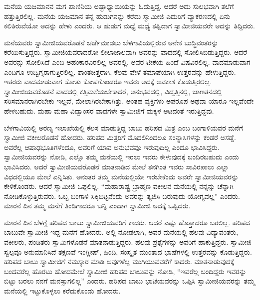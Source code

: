  ಮನೆಯ ಯಜಮಾನನ ಮಗ ಪಾಣಿನಿಯ ಅಷ್ಟಾಧ್ಯಾಯಿಯನ್ನು ಓದುತ್ತಿದ್ದ. ಆದರೆ ಅದು ಸುಲಭವಾಗಿ ತಲೆಗೆ ಹತ್ತುತ್ತಿರಲಿಲ್ಲ. ಮನೆಯ ಯಜಮಾನ ತನ್ನ ಹುಡುಗನನ್ನು ಕರೆದು ಸ್ವಾಮೀಜಿ ಎದುರಿಗೆ ವ್ಯಾಕರಣದಲ್ಲಿ ಏನು ಕಲಿತಿರುವೆಯೋ ಅದನ್ನು ಹೇಳು ಎಂದರು. ಆ ಹುಡುಗ ಮಧ್ಯೆ ಮಧ್ಯೆ ತಪ್ಪಿದಾಗ ಸ್ವಾಮೀಜಿಯವರೇ ಅದನ್ನು ತಿದ್ದಿದರು. 

 ಮನೆಯವರು ಸ್ವಾಮೀಜಿಯವರೊಡನೆ ಚರ್ಚೆಮಾಡಲು ಬೆಳಗಾವಿಯಲ್ಲಿರುವ ಅನೇಕ ಬುದ್ಧಿವಂತರನ್ನು ಕರೆಯಿಸುತ್ತಿದ್ದರು. ಸ್ವಾಮೀಜಿಯವರಾದರೋ ಲೀಲಾಜಾಲವಾಗಿ ಅವರನ್ನು ವಾದದಲ್ಲಿ ಸೋಲಿಸಿಬಿಡುತ್ತಿದ್ದರು. ಆದರೆ ಅವರನ್ನು ಸೋಲಿಸಿದೆ ಎಂಬ ಅಹಂಕಾರವಿರಲಿಲ್ಲ ಅವರಲ್ಲಿ. ಅವರ ಟೀಕೆಯ ಹಿಂದೆ ವಿಷವಿರಲಿಲ್ಲ. ವಾದಮಾಡುವಾಗ ಎಂದಿಗೂ ಉದ್ವಿಗ್ನರಾಗುತ್ತಿರಲಿಲ್ಲ. ಶಾಂತಚಿತ್ತರಾಗಿ, ಕೆಲವು ವೇಳೆ ತಮಾಷೆಯಾಗಿ ಉತ್ತರವನ್ನು ಹೇಳುತ್ತಿದ್ದರು. ಇತರರು ವಾದಮಾಡುವಾಗ ಸೋತು ಕೋಪಗೊಂಡರೂ ಇವರು ಅದಕ್ಕೆ ಅವಕಾಶ ಕೊಡುತ್ತಿರಲಿಲ್ಲ. ಸ್ವಾಮೀಜಿಯವರೊಡನೆ ವಾದದಲ್ಲಿ ಕತ್ತಿಮಸೆಯಬೇಕಾದರೆ, ಅನುಭವದಲ್ಲಿ, ವಿದ್ವತ್ತಿನಲ್ಲಿ, ಜಾಣತನದಲ್ಲಿ ಸರಿಸಮಾನರಾಗಿರಬೇಕು ಇಲ್ಲವೆ, ಮೇಲಾಗಿರಬೇಕಾಗಿತ್ತು. ಅಂತಹ ವ್ಯಕ್ತಿಗಳು ಅಪರೂಪ ಅಥವಾ ಯಾರೂ ಇಲ್ಲವೆಂದೇ ಹೇಳಬಹುದು. ಮಹಾ ಮಹಾ ವಿದ್ವಾಂಸರ ವಾದಗಳೇ ಸ್ವಾಮೀಜಿಗೆ ಮಕ್ಕಳ ಆಟದಂತೆ ಇರುತ್ತಿದ್ದವು. 

 ಬೆಳಗಾವಿಯಲ್ಲಿ ಅರಣ್ಯ ಇಲಾಖೆಯಲ್ಲಿ ಕೆಲಸ ಮಾಡುತ್ತಿದ್ದ ಬಾಬು ಹರಿಪದ ಮಿತ್ರ ಎಂಬ ಬಂಗಾಳಿಯವರ ಮನೆಗೆ ಸ್ವಾಮೀಜಿ ವಕೀಲರೊಡನೆ ಹೋದರು. ಹರಿಪದ ಮಿತ್ರರಿಗೆ ಮೊದಲಿನಿಂದಲೂ ಸಂನ್ಯಾಸಿಗಳನ್ನು ಕಂಡರೆ ಅಸಡ್ಡೆ. ಅವರೆಲ್ಲ ಆಷಾಢಭೂತಿಗಳೆಂದೂ, ಅವರಿಗೆ ಯಾವ ಅನುಭವವೂ ಇರುವುದಿಲ್ಲ ಎಂದೂ ಭಾವಿಸಿದ್ದರು. ಸ್ವಾಮೀಜಿಯವರನ್ನು ನೋಡಿ, ಎಲ್ಲೊ ತಮ್ಮ ಮನೆಯಲ್ಲಿ ಇರಲು ಇವರು ಕೇಳುವುದಕ್ಕೆ ಬಂದಿರಬಹುದು ಎಂದು ಭಾವಿಸಿದರು. ಆದರೆ ಸ್ವಾಮೀಜಿಯವರೊಡನೆ ಮಾತನಾಡಿದ ಮೇಲೆ ತನಗಿಂತ ಇವರು ಸಾವಿರಪಾಲು ಎಲ್ಲಾ ವಿಧದಲ್ಲಿಯೂ ಮೇಲೆ ಎನ್ನಿಸಿತು. ಅನಂತರ ತಮ್ಮ ಮನೆಯಲ್ಲಿಯೇ ಇರಬೇಕೆಂದು ಅವರೇ ಸ್ವಾಮೀಜಿಯವರನ್ನು ಕೇಳಿಕೊಂಡರು. ಆದರೆ ಸ್ವಾಮೀಜಿ ಒಪ್ಪಲಿಲ್ಲ. “ಮಹಾರಾಷ್ಟ್ರ ಬ್ರಾಹ್ಮಣ ವಕೀಲನ ಮನೆಯಲ್ಲಿ ನನ್ನನ್ನು ಚೆನ್ನಾಗಿ ನೋಡಿಕೊಳ್ಳುತ್ತಿರುವರು. ಒಬ್ಬ ಬಂಗಾಳಿ ಸಿಕ್ಕಿಬಿಟ್ಟನೆಂದು ಅವರನ್ನು ತ್ಯಜಿಸಿ ಬರುವುದು ಯೋಗ್ಯವಲ್ಲ” ಎಂದರು. ಮಾರನೆ ದಿನ ತಮ್ಮ ಮನೆಗೆ ತಿಂಡಿಗಾದರೂ ಬನ್ನಿ ಎಂದಾಗ ಸ್ವಾಮೀಜಿ ಅದಕ್ಕೆ ಒಪ್ಪಿದರು. 

 ಮಾರನೆ ದಿನ ಬೆಳಗ್ಗೆ ಹರಿಪದ ಬಾಬು ಸ್ವಾಮೀಜಿಯವರಿಗೆ ಕಾದರು. ಆದರೆ ಎಷ್ಟು ಹೊತ್ತಾದರೂ ಬರಲಿಲ್ಲ. ಹರಿಪದ ಬಾಬುವೇ ಸ್ವಾಮೀಜಿ ಇದ್ದ ಮನೆಗೆ ಹೋದರು. ಅಲ್ಲಿ ನೋಡಲಾಗಿ, ಅವರ ಮನೆಯಲ್ಲಿ ಹಲವು ವಿದ್ಯಾವಂತರು, ವಕೀಲರು, ಪಂಡಿತರು ಸ್ವಾಮಿಗಳೊಡನೆ ಮಾತನಾಡುತ್ತಿದ್ದರು. ಹಲವು ಪ್ರಶ್ನೆಗಳನ್ನು ಅವರಿಗೆ ಹಾಕುತ್ತಿದ್ದರು. ಸ್ವಾಮೀಜಿ ಸ್ವಲ್ಪವೂ ಅನುಮಾನಿಸಿದೆ ತಕ್ಷಣವೆ ಇಂಗ್ಲೀಷ್, ಹಿಂದಿ, ಸಂಸ್ಕೃತ ಮುಂತಾದ ಭಾಷೆಗಳಲ್ಲಿ ಉತ್ತರವನ್ನು ಕೊಡುತ್ತಿದ್ದರು. ಹರಿಪದ ಬಾಬು ಸ್ವಾಮೀಜಿಗೆ ನಮಸ್ಕಾರ ಮಾಡಿ ಅವುಗಳೆಲ್ಲ ಮುಗಿಯುವವರೆಗೆ ಕಾದರು. ಮಾತನಾಡುವುದಕ್ಕೆ ಬಂದವರೆಲ್ಲ ಹೊರಟು ಹೋದಮೇಲೆ ಸ್ವಾಮೀಜಿ ಹರಿಪದ ಬಾಬುವನ್ನು ನೋಡಿ, “ಇವರೆಲ್ಲ ಬಂದಿದ್ದರು ಇವರನ್ನು ಬಿಟ್ಟು ಬರಲು ನನಗೆ ಮನಸ್ಸಾಗಲಿಲ್ಲ” ಎಂದರು. ಹರಿಪದ ಬಾಬು ಭಾಟೆಯವರನ್ನು ಒಪ್ಪಿಸಿ ಸ್ವಾಮೀಜಿಯವರನ್ನು ತಮ್ಮ ಮನೆಯಲ್ಲಿ ಇಟ್ಟುಕೊಳ್ಳಲು ಕರೆದುಕೊಂಡು ಹೋದರು. 


